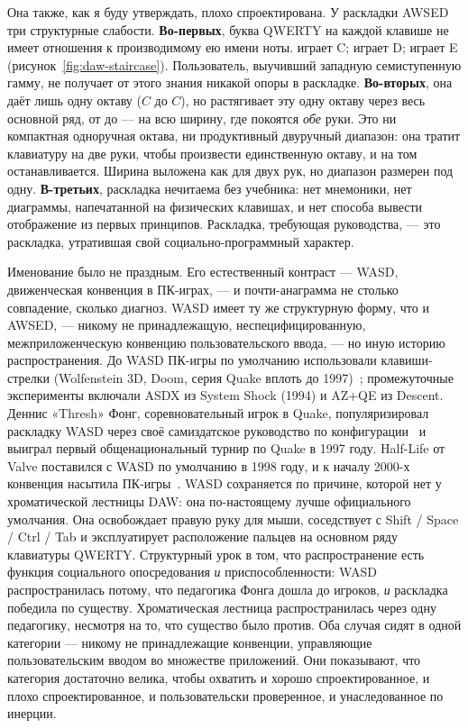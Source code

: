 \documentclass[10pt,letterpaper,twocolumn]{article}
\DeclareRobustCommand{\key}[1]{\tikz[baseline=(k.base)]{%
 \node[fill=keystroke, rounded corners=1.3pt, inner xsep=2.4pt,
    inner ysep=1.9pt, anchor=base, yshift=-1.2pt] at (0,0)
  {\footnotesize\ttfamily\bfseries\vphantom{A}\phantom{#1}};
 \node[draw=keystroke, line width=0.4pt, fill=keyfill,
    rounded corners=1.3pt, inner xsep=2.4pt, inner ysep=1.9pt,
    anchor=base] (k) at (0,0)
  {\footnotesize\ttfamily\bfseries\vphantom{A}#1};}}
\begin{document}
Она также, как я буду утверждать, плохо спроектирована. У раскладки AWSED три структурные слабости. \textbf{Во-первых}, буква QWERTY на каждой клавише не имеет отношения к производимому ею имени ноты. \key{A} играет C; \key{S} играет D; \key{D} играет E (рисунок~\ref{fig:daw-staircase}). Пользователь, выучивший западную семиступенную гамму, не получает от этого знания никакой опоры в раскладке. \textbf{Во-вторых}, она даёт лишь одну октаву ($C$ до $C$), но растягивает эту одну октаву через весь основной ряд, от \key{A} до \key{K} --- на всю ширину, где покоятся \emph{обе} руки. Это ни компактная одноручная октава, ни продуктивный двуручный диапазон: она тратит клавиатуру на две руки, чтобы произвести единственную октаву, и на том останавливается. Ширина выложена как для двух рук, но диапазон размерен под одну. \textbf{В-третьих}, раскладка нечитаема без учебника: нет мнемоники, нет диаграммы, напечатанной на физических клавишах, и нет способа вывести отображение из первых принципов. Раскладка, требующая руководства, --- это раскладка, утратившая свой социально-программный характер.

Именование было не праздным. Его естественный контраст --- WASD, движенческая конвенция в ПК-играх, --- и почти-анаграмма не столько совпадение, сколько диагноз. WASD имеет ту же структурную форму, что и AWSED, --- никому не принадлежащую, неспецифицированную, межприложенческую конвенцию пользовательского ввода, --- но иную историю распространения. До WASD ПК-игры по умолчанию использовали клавиши-стрелки (Wolfenstein 3D, Doom, серия Quake вплоть до 1997)~\citep{wikipedia_arrow_keys}; промежуточные эксперименты включали ASDX из System Shock (1994) и AZ+QE из Descent. Деннис «Thresh» Фонг, соревновательный игрок в Quake, популяризировал раскладку WASD через своё самиздатское руководство по конфигурации~\citep{thresh_quake_bible} и выиграл первый общенациональный турнир по Quake в 1997 году. Half-Life от Valve поставился с WASD по умолчанию в 1998 году, и к началу 2000-х конвенция насытила ПК-игры~\citep{fenlon2016wasd}. WASD сохраняется по причине, которой нет у хроматической лестницы DAW: она по-настоящему лучше официального умолчания. Она освобождает правую руку для мыши, соседствует с Shift / Space / Ctrl / Tab и эксплуатирует расположение пальцев на основном ряду клавиатуры QWERTY. Структурный урок в том, что распространение есть функция социального опосредования \emph{и} приспособленности: WASD распространилась потому, что педагогика Фонга дошла до игроков, \emph{и} раскладка победила по существу. Хроматическая лестница распространилась через одну педагогику, несмотря на то, что существо было против. Оба случая сидят в одной категории --- никому не принадлежащие конвенции, управляющие пользовательским вводом во множестве приложений. Они показывают, что категория достаточно велика, чтобы охватить и хорошо спроектированное, и плохо спроектированное, и пользовательски проверенное, и унаследованное по инерции.
\end{document}
